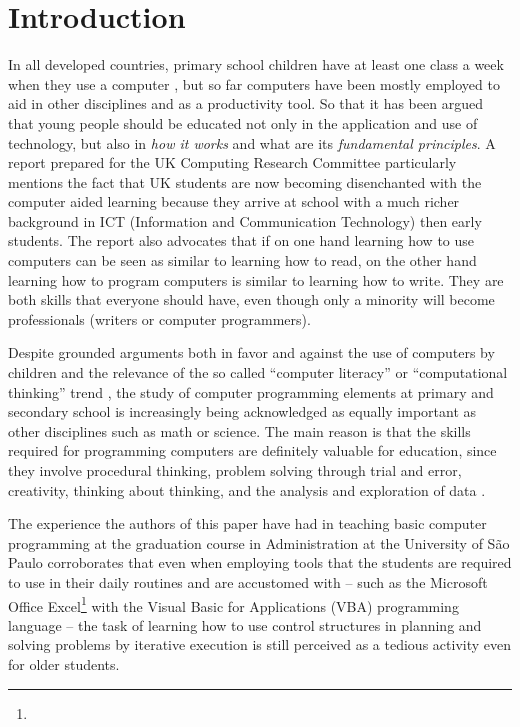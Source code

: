 \documentclass{sigchi}
\begin{document}


\section{Introduction}
    In all developed countries, primary school children have at least one class
    a week when they use a computer \cite{Istrate2010}, but so far computers
    have been mostly employed to aid in other disciplines and as a productivity
    tool. So that it has been argued that young people should be educated not
    only in the application and use of technology, but also in
    \textit{how it works} and what are its \textit{fundamental principles}. A
    report prepared for the UK Computing Research Committee \cite{Jones2009}
    particularly mentions the fact that UK students are now becoming
    disenchanted with the computer aided learning because they arrive at school
    with a much richer background in ICT (Information and Communication
    Technology) then early students. The report also advocates that if on one
    hand learning how to use computers can be seen as similar to learning how to
    read, on the other hand learning how to program computers is similar to
    learning how to write. They are both skills that everyone should have, even
    though only a minority will become professionals (writers or computer
    programmers).

    Despite grounded arguments both in favor and against the use of computers by
    children \cite{Istrate2010,Setzer2001} and the relevance of the so called
    ``computer literacy'' or ``computational thinking'' trend
    \cite{Wing2006,Atwood2012}, the study of computer programming elements at
    primary and secondary school is increasingly being acknowledged as equally
    important as other disciplines such as math or science. The main reason is
    that the skills required for programming computers are definitely valuable
    for education, since they involve procedural thinking, problem solving
    through trial and error, creativity, thinking about thinking, and the
    analysis and exploration of data \cite{Kahn1999}.

    The experience the authors of this paper have had in teaching basic computer
    programming at the graduation course in Administration at the University of
    S\~ao Paulo corroborates that even when employing tools that the students
    are required to use in their daily routines and are accustomed with -- such
    as the Microsoft Office Excel\footnote{\excelsite} with the Visual Basic for
    Applications (VBA) programming language -- the task of learning how to use
    control structures in planning and solving problems by iterative execution
    is still perceived as a tedious activity even for older students.
\end{document}
